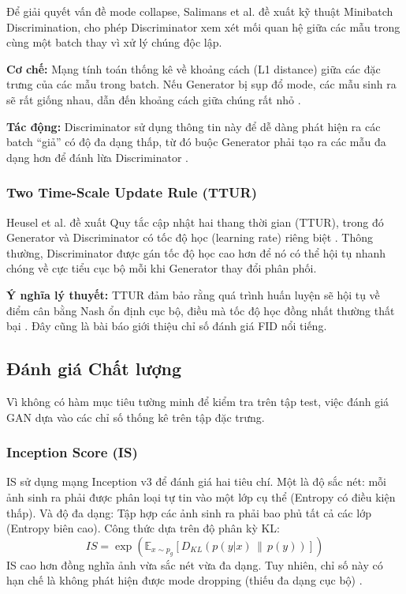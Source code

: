 Để giải quyết vấn đề mode collapse, Salimans et al. \cite{Salimans2016} đề xuất kỹ thuật Minibatch Discrimination, cho phép Discriminator xem xét mối quan hệ giữa các mẫu trong cùng một batch thay vì xử lý chúng độc lập.

\textbf{Cơ chế:} Mạng tính toán thống kê về khoảng cách (L1 distance) giữa các đặc trưng của các mẫu trong batch. Nếu Generator bị sụp đổ mode, các mẫu sinh ra sẽ rất giống nhau, dẫn đến khoảng cách giữa chúng rất nhỏ \cite{Salimans2016}.

\textbf{Tác động:} Discriminator sử dụng thông tin này để dễ dàng phát hiện ra các batch ``giả'' có độ đa dạng thấp, từ đó buộc Generator phải tạo ra các mẫu đa dạng hơn để đánh lừa Discriminator \cite{Salimans2016}.


\subsubsection{Two Time-Scale Update Rule (TTUR)}
Heusel et al. \cite{Heusel2017} đề xuất Quy tắc cập nhật hai thang thời gian (TTUR), trong đó Generator và Discriminator có tốc độ học (learning rate) riêng biệt \cite{Heusel2017}. Thông thường, Discriminator được gán tốc độ học cao hơn để nó có thể hội tụ nhanh chóng về cực tiểu cục bộ mỗi khi Generator thay đổi phân phối.

\textbf{Ý nghĩa lý thuyết:} TTUR đảm bảo rằng quá trình huấn luyện sẽ hội tụ về điểm cân bằng Nash ổn định cục bộ, điều mà tốc độ học đồng nhất thường thất bại \cite{Heusel2017}. Đây cũng là bài báo giới thiệu chỉ số đánh giá FID nổi tiếng.

\subsection{Đánh giá Chất lượng}
Vì không có hàm mục tiêu tường minh để kiểm tra trên tập test, việc đánh giá GAN dựa vào các chỉ số thống kê trên tập đặc trưng.

\subsubsection{Inception Score (IS)}
IS \cite{Salimans2016} sử dụng mạng Inception v3 để đánh giá hai tiêu chí. Một là độ sắc nét: mỗi ảnh sinh ra phải được phân loại tự tin vào một lớp cụ thể (Entropy có điều kiện thấp).
Và độ đa dạng: Tập hợp các ảnh sinh ra phải bao phủ tất cả các lớp (Entropy biên cao).
Công thức dựa trên độ phân kỳ KL:
\begin{equation}
\label{eq:inception_score}
IS = \exp\!\left(\mathbb{E}_{x \sim p_g}\left[D_{KL}\!\left(p(y|x) \,\|\, p(y)\right)\right]\right)
\end{equation}
IS cao hơn đồng nghĩa ảnh vừa sắc nét vừa đa dạng. Tuy nhiên, chỉ số này có hạn chế là không phát hiện được mode dropping (thiếu đa dạng cục bộ) \cite{Salimans2016}.

